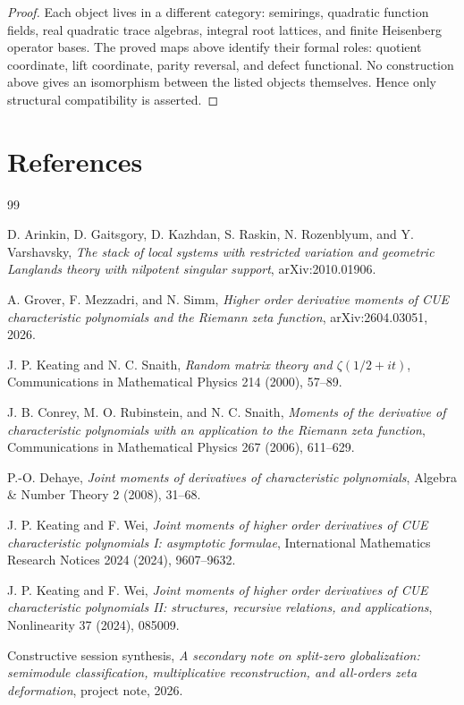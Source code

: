 \documentclass[11pt]{article}
\theoremstyle{plain}
\theoremstyle{definition}
\begin{document}
\begin{proof}
Each object lives in a different category: semirings, quadratic function fields, real quadratic trace algebras, integral root lattices, and finite Heisenberg operator bases.  The proved maps above identify their formal roles: quotient coordinate, lift coordinate, parity reversal, and defect functional.  No construction above gives an isomorphism between the listed objects themselves.  Hence only structural compatibility is asserted.
\end{proof}

\section*{References}
\begin{thebibliography}{99}

D. Arinkin, D. Gaitsgory, D. Kazhdan, S. Raskin, N. Rozenblyum, and Y. Varshavsky,
\emph{The stack of local systems with restricted variation and geometric Langlands theory with nilpotent singular support}, arXiv:2010.01906.

A. Grover, F. Mezzadri, and N. Simm,
\emph{Higher order derivative moments of CUE characteristic polynomials and the Riemann zeta function}, arXiv:2604.03051, 2026.

J. P. Keating and N. C. Snaith,
\emph{Random matrix theory and \(\zeta(1/2+it)\)}, Communications in Mathematical Physics 214 (2000), 57--89.

J. B. Conrey, M. O. Rubinstein, and N. C. Snaith,
\emph{Moments of the derivative of characteristic polynomials with an application to the Riemann zeta function}, Communications in Mathematical Physics 267 (2006), 611--629.

P.-O. Dehaye,
\emph{Joint moments of derivatives of characteristic polynomials}, Algebra \& Number Theory 2 (2008), 31--68.

J. P. Keating and F. Wei,
\emph{Joint moments of higher order derivatives of CUE characteristic polynomials I: asymptotic formulae}, International Mathematics Research Notices 2024 (2024), 9607--9632.

J. P. Keating and F. Wei,
\emph{Joint moments of higher order derivatives of CUE characteristic polynomials II: structures, recursive relations, and applications}, Nonlinearity 37 (2024), 085009.

Constructive session synthesis,
\emph{A secondary note on split-zero globalization: semimodule classification, multiplicative reconstruction, and all-orders zeta deformation}, project note, 2026.


\end{thebibliography}
\end{document}
